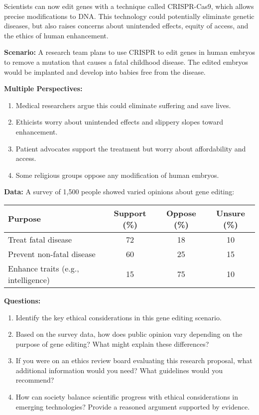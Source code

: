 \documentclass[justified,notoc]{tufte-book}
\newenvironment{pisascenario}[1]{%
    \begin{tcolorbox}[colback=secondary!10,colframe=secondary,title=\textbf{Real-World Scenario: #1}]
}{%
    \end{tcolorbox}
}
\begin{document}
\begin{pisascenario}{Gene Editing and Society}
Scientists can now edit genes with a technique called CRISPR-Cas9, which allows precise modifications to DNA. This technology could potentially eliminate genetic diseases, but also raises concerns about unintended effects, equity of access, and the ethics of human enhancement.

\textbf{Scenario:} A research team plans to use CRISPR to edit genes in human embryos to remove a mutation that causes a fatal childhood disease. The edited embryos would be implanted and develop into babies free from the disease.

\textbf{Multiple Perspectives:}
\begin{enumerate}
    \item Medical researchers argue this could eliminate suffering and save lives.
    \item Ethicists worry about unintended effects and slippery slopes toward enhancement.
    \item Patient advocates support the treatment but worry about affordability and access.
    \item Some religious groups oppose any modification of human embryos.
\end{enumerate}

\textbf{Data:} A survey of 1,500 people showed varied opinions about gene editing:
\begin{center}
\begin{tabular}{|l|c|c|c|}
\hline
\textbf{Purpose} & \textbf{Support (\%)} & \textbf{Oppose (\%)} & \textbf{Unsure (\%)} \\
\hline
Treat fatal disease & 72 & 18 & 10 \\
\hline
Prevent non-fatal disease & 60 & 25 & 15 \\
\hline
Enhance traits (e.g., intelligence) & 15 & 75 & 10 \\
\hline
\end{tabular}
\end{center}

\textbf{Questions:}
\begin{enumerate}
    \item Identify the key ethical considerations in this gene editing scenario.
    \item Based on the survey data, how does public opinion vary depending on the purpose of gene editing? What might explain these differences?
    \item If you were on an ethics review board evaluating this research proposal, what additional information would you need? What guidelines would you recommend?
    \item How can society balance scientific progress with ethical considerations in emerging technologies? Provide a reasoned argument supported by evidence.
\end{enumerate}
\end{pisascenario}
\end{document}
